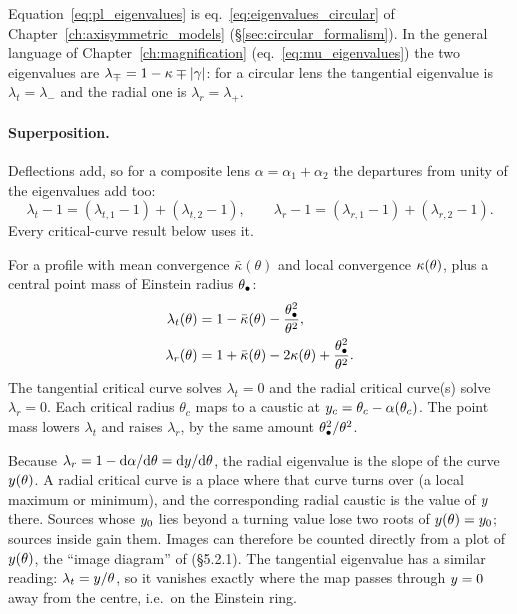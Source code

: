 \begin{bridge}
Equation~\eqref{eq:pl_eigenvalues} is
eq.~\eqref{eq:eigenvalues_circular} of
Chapter~\ref{ch:axisymmetric_models} (\S\ref{sec:circular_formalism}).
In the general language of Chapter~\ref{ch:magnification}
(eq.~\ref{eq:mu_eigenvalues}) the two eigenvalues are
$\lambda_\mp = 1-\kappa\mp|\gamma|$: for a circular lens the
tangential eigenvalue is $\lambda_t=\lambda_-$ and the
radial one is $\lambda_r=\lambda_+$.
\end{bridge}

\paragraph{Superposition.}
Deflections add, so for a composite lens
$\alpha=\alpha_1+\alpha_2$ the departures from unity of the
eigenvalues add too:
\begin{equation}
    \lambda_t - 1 = (\lambda_{t,1}-1) + (\lambda_{t,2}-1) ,
    \qquad
    \lambda_r - 1 = (\lambda_{r,1}-1) + (\lambda_{r,2}-1) .
    \label{eq:pl_superposition}
\end{equation}
Every critical-curve result below uses it.

\begin{keybox}
For a profile with mean convergence $\bar\kappa(\theta)$ and local
convergence $\kappa(\theta)$, plus a central point mass of Einstein
radius $\theta_{\bullet}$:
\begin{align}
    \lambda_t(\theta) &= 1-\bar\kappa(\theta)-\frac{\theta_{\bullet}^2}{\theta^2} ,
    \label{eq:pl_recipe_lt}\\
    \lambda_r(\theta) &= 1+\bar\kappa(\theta)-2\kappa(\theta)+\frac{\theta_{\bullet}^2}{\theta^2} .
    \label{eq:pl_recipe_lr}
\end{align}
The tangential critical curve solves $\lambda_t=0$ and the radial
critical curve(s) solve $\lambda_r=0$.  Each critical radius
$\theta_c$ maps to a caustic at $y_c=\theta_c-\alpha(\theta_c)$.
The point mass lowers $\lambda_t$ and raises
$\lambda_r$, by the same amount $\theta_{\bullet}^2/\theta^2$.
\end{keybox}

\begin{annotation}
Because $\lambda_r=1-\dd\alpha/\dd\theta=\dd y/\dd\theta$, the
radial eigenvalue is the slope of the curve $y(\theta)$.  A
radial critical curve is a place where that curve turns over (a local
maximum or minimum), and the corresponding radial caustic is the value
of $y$ there.  Sources whose $y_0$ lies beyond a turning value
lose two roots of $y(\theta)=y_0$; sources inside gain them.
Images can therefore be counted directly from a plot of
$y(\theta)$, the
``image diagram'' of \citet{meneghetti_introduction_2021} (\S5.2.1).
The tangential eigenvalue has a similar reading:
$\lambda_t=y/\theta$, so it vanishes exactly where the map passes
through $y=0$ away from the centre, i.e.\ on the Einstein ring.
\end{annotation}


